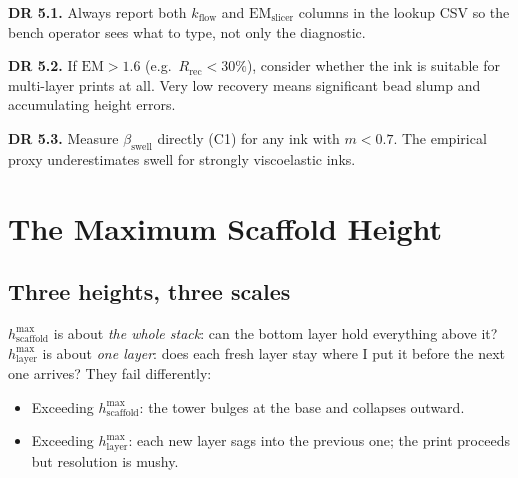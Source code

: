 \documentclass[11pt,a4paper]{article}
\begin{document}
\begin{designrulebox}
\textbf{DR 5.1.} Always report both $k_\mathrm{flow}$ and
$\mathrm{EM}_\mathrm{slicer}$ columns in the lookup CSV so the
bench operator sees what to type, not only the diagnostic.

\textbf{DR 5.2.} If $\mathrm{EM}>1.6$ (e.g.\ $R_\mathrm{rec}<30\%$),
consider whether the ink is suitable for multi-layer prints at all.
Very low recovery means significant bead slump and accumulating height
errors.

\textbf{DR 5.3.} Measure $\beta_\mathrm{swell}$ directly (C1) for
any ink with $m<0.7$. The empirical proxy underestimates swell for
strongly viscoelastic inks.
\end{designrulebox}

\section{The Maximum Scaffold Height}
\label{sec:hmax}

\subsection{Three heights, three scales}

\begin{center}
\end{center}

\begin{intuitionbox}
$h_\mathrm{scaffold}^{\max}$ is about \emph{the whole stack}: can the
bottom layer hold everything above it? $h_\mathrm{layer}^{\max}$ is
about \emph{one layer}: does each fresh layer stay where I put it before
the next one arrives? They fail differently:
\begin{itemize}[leftmargin=1.4em,itemsep=1pt]
\item Exceeding $h_\mathrm{scaffold}^{\max}$: the tower bulges at the
  base and collapses outward.
\item Exceeding $h_\mathrm{layer}^{\max}$: each new layer sags into the
  previous one; the print proceeds but resolution is mushy.
\end{itemize}
\end{intuitionbox}
\end{document}
